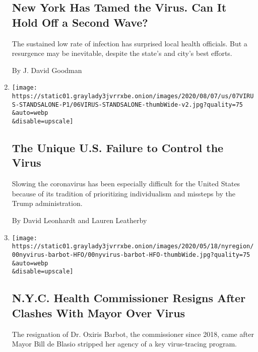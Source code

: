 \begin{enumerate}
  \hypertarget{new-york-has-tamed-the-virus-can-it-hold-off-a-second-wave}{%
  \subsection{New York Has Tamed the Virus. Can It Hold Off a Second
  Wave?}\label{new-york-has-tamed-the-virus-can-it-hold-off-a-second-wave}}

  The sustained low rate of infection has surprised local health
  officials. But a resurgence may be inevitable, despite the state's and
  city's best efforts.

  By J. David Goodman
\item
  \href{/2020/08/06/us/coronavirus-us.html}{}

  \texttt{[image: https://static01.graylady3jvrrxbe.onion/images/2020/08/07/us/07VIRUS-STANDSALONE-P1/06VIRUS-STANDSALONE-thumbWide-v2.jpg?quality=75\\\&auto=webp\\\&disable=upscale]}

  \hypertarget{the-unique-us-failure-to-control-the-virus}{%
  \subsection{The Unique U.S. Failure to Control the
  Virus}\label{the-unique-us-failure-to-control-the-virus}}

  Slowing the coronavirus has been especially difficult for the United
  States because of its tradition of prioritizing individualism and
  missteps by the Trump administration.

  By David Leonhardt and Lauren Leatherby
\item
  \href{/2020/08/04/nyregion/oxiris-barbot-health-commissioner-resigns.html}{}

  \texttt{[image: https://static01.graylady3jvrrxbe.onion/images/2020/05/18/nyregion/00nyvirus-barbot-HFO/00nyvirus-barbot-HFO-thumbWide.jpg?quality=75\\\&auto=webp\\\&disable=upscale]}

  \hypertarget{nyc-health-commissioner-resigns-after-clashes-with-mayor-over-virus}{%
  \subsection{N.Y.C. Health Commissioner Resigns After Clashes With
  Mayor Over
  Virus}\label{nyc-health-commissioner-resigns-after-clashes-with-mayor-over-virus}}

  The resignation of Dr. Oxiris Barbot, the commissioner since 2018,
  came after Mayor Bill de Blasio stripped her agency of a key
  virus-tracing program.


\end{enumerate}

